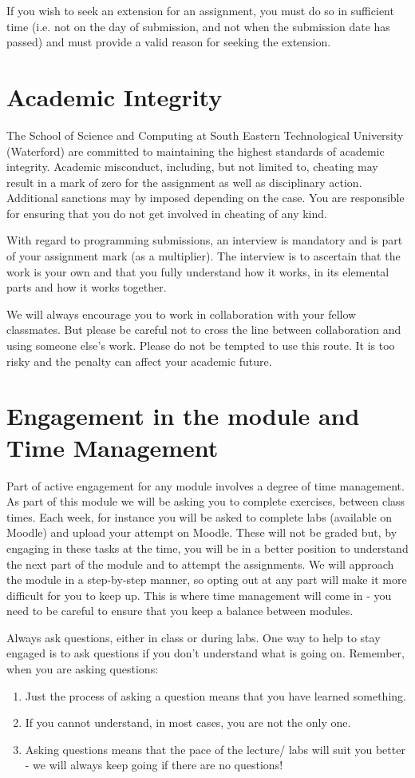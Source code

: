 \documentclass{article}
\begin{document}
If you wish to seek an extension for an assignment, you must do so in sufficient time (i.e. not on the day of submission, and not 
when the submission date has passed) and must provide a valid reason for seeking the extension. 


\section{Academic Integrity}
The School of Science and Computing  at South Eastern Technological University (Waterford) are  committed to maintaining the highest standards of academic integrity. 
Academic misconduct, including, but not limited to, cheating may result in a mark of zero for the assignment as well as disciplinary action.
 Additional sanctions may by imposed depending on the case. You are responsible for ensuring that you do not get involved in cheating of any kind. 
 
 With regard to programming submissions, an interview is mandatory and is part of your assignment mark (as a multiplier). 
 The interview is to ascertain that the work is your own and that you fully understand how it works, in its elemental parts and how it works together. 
 
We  will always encourage you to work in collaboration with your fellow classmates. But please be careful not to cross the line between collaboration and using someone else's work. 
 Please do not be tempted to use this route. 
 It is too risky and the penalty can affect your academic future. 
\pagebreak
\section{Engagement in the module and Time Management}
 Part of active engagement  for any module involves a degree of time management. 
 As part of this module we will be asking you to complete exercises, between class times. 
 Each week, for instance you will be asked to complete labs (available on Moodle) and upload your attempt on Moodle.
 These will not be graded but, by engaging in these tasks at the time, you will be in a better position to 
 understand the next part of the module and to attempt the assignments. We will approach the module in a step-by-step manner, 
 so opting out at any part will make it more difficult for you to keep up. 
 This is where time management will come in - you need to be careful to ensure that you keep a balance between modules. 
 
 Always ask questions, either in class or during labs.  One way to help to stay engaged is to ask questions if you don't understand what is going on. 
 Remember, when you are asking questions:
 \begin{enumerate}
    \item Just the process of asking a question means that you have learned something. 
    \item If you cannot understand, in most cases, you are not the only one. 
    \item Asking questions means that the pace of the lecture/ labs will suit you better - we will always keep going if there are no questions! 
 \end{enumerate}
\end{document}
